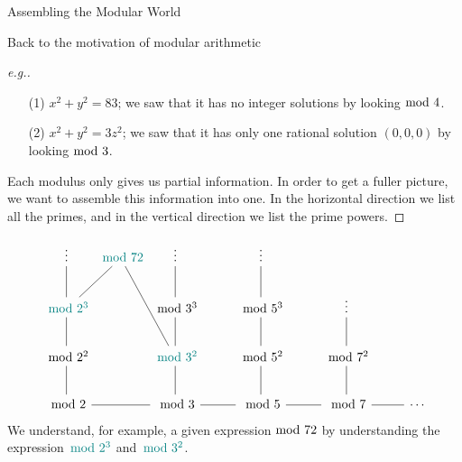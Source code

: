\vspace*{1em}

\begin{center}
{\Large Assembling the Modular World}
\end{center}

Back to the motivation of modular arithmetic
\begin{proof}[e.g.]\renewcommand{\qedsymbol}{}
\begin{itemize}
\item[(1)] $x^2 + y^2 = 83$; we saw that it has no integer solutions by looking$\text{ mod }{4}$.
\end{itemize}
\begin{itemize}[leftmargin=4.4em]
\item[(2)] $x^2 + y^2 = 3z^2$; we saw that it has only one rational solution $(0,0,0)$ by looking$\text{ mod }{3}$.
\end{itemize}
Each modulus only gives us partial information. In order to get a fuller picture, we want to assemble this information into one. In the horizontal direction we list all the primes, and in the vertical direction we list the prime powers.
\end{proof}
\vspace*{-1em}
\[\begin{tikzcd}
\vdots \arrow[d, no head]                  &[-2.5em] \color{teal}\modar{72} \arrow[ld, no head] \arrow[rdd, no head] &[-2.5em] \vdots \arrow[d, no head]                  & \vdots \arrow[d, no head]      &                                &        \\
\color{teal}\modar{2^3} \arrow[d, no head] &                                   & \modar{3^3} \arrow[d, no head]             & \modar{5^3} \arrow[d, no head] & \vdots \arrow[d, no head]      &        \\[0.5em]
\modar{2^2} \arrow[d, no head]             &                                   & \color{teal}\modar{3^2} \arrow[d, no head] & \modar{5^2} \arrow[d, no head] & \modar{7^2} \arrow[d, no head] &        \\[0.5em]
\modar{2} \arrow[rr, no head]              &                                   & \modar{3} \arrow[r, no head]               & \modar{5} \arrow[r, no head]   & \modar{7} \arrow[r, no head]   & \cdots
\end{tikzcd}\]
We understand, for example, a given expression$\text{ mod }{72}$ by understanding the expression $\!{\color{teal}\modar{2^3}}$ and $\!{\color{teal}\modar{3^2}}$.

\vspace*{1.5em}

